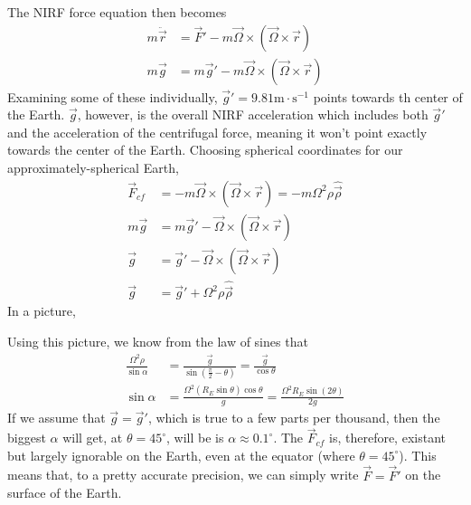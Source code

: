 \documentclass[a4paper]{article}
\begin{document}
The NIRF force equation then becomes
\begin{align*}
	m\ddot{\vec{r}} &= \vec{F}'-m\vec{\Omega}\times(\vec{\Omega}\times
	\vec{r})\\
	m\vec{g} &= m\vec{g}' - m\vec{\Omega}\times(\vec{\Omega}\times\vec{r})
\end{align*}
Examining some of these individually, $\vec{g}'=9.81 \mathrm{m\cdot s^{-1}}$
points towards th center of the Earth. $\vec{g}$, however, is the overall
NIRF acceleration which includes both $\vec{g}'$ and the acceleration of the
centrifugal force, meaning it won't point exactly towards the center of the
Earth. Choosing spherical coordinates for our approximately-spherical Earth,
\begin{align*}
	\vec{F}_{cf} &= -m\vec{\Omega}\times(\vec{\Omega}\times\vec{r})
		= -m\Omega^2\rho\hat{\vec{\rho}}\\
	m\vec{g} &= m\vec{g}' - \vec{\Omega}\times(\vec{\Omega}\times\vec{r})\\
	\vec{g} &= \vec{g}' - \vec{\Omega}\times(\vec{\Omega}\times\vec{r})\\
	\vec{g} &= \vec{g}' + \Omega^2\rho\hat{\vec{\rho}}
\end{align*}
In a picture,
\begin{center}
\end{center}
Using this picture, we know from the law of sines that
\begin{align*}
	\frac{\Omega^2\rho}{\sin\alpha} &= \frac{\vec{g}}{\sin\left(
		\frac{\pi}{2}-\theta\right)}
		= \frac{\vec{g}}{\cos\theta}\\
		\sin\alpha &= \frac{\Omega^2(R_E\sin\theta)\cos\theta}
		{g} = \frac{\Omega^2R_E\sin(2\theta)}{2g}
\end{align*}
If we assume that $\vec{g} = \vec{g}'$, which is true to a few parts per
thousand, then the biggest $\alpha$ will get, at $\theta=45^\circ$, will
be is $\alpha\approx0.1^\circ$. The $\vec{F}_{cf}$ is, therefore, existant but
largely ignorable on the Earth, even at the equator (where $\theta=45^\circ$).
This means that, to a pretty accurate precision, we can simply write
$\vec{F} = \vec{F}'$ on the surface of the Earth.
\end{document}
